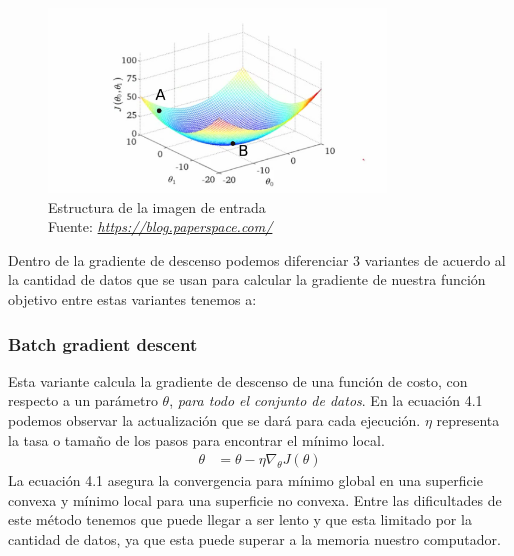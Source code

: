 \begin{figure}[H]
	\centering
	\includegraphics[width=0.8\textwidth]{Figures/gd.png}
	\caption{Estructura de la imagen de entrada \\ Fuente:  \href{https://blog.paperspace.com/intro-to-optimization-in-deep-learning-gradient-descent/}{\textit{https://blog.paperspace.com/}}}
	\label{image}
\end{figure} 

Dentro de la gradiente de descenso podemos diferenciar 3 variantes de acuerdo al la cantidad de datos que se usan para calcular la gradiente de nuestra función objetivo entre estas variantes tenemos a:\\

\subsubsection{Batch gradient descent}
Esta variante calcula la gradiente de descenso de una función de costo, con respecto a un parámetro $\theta$, \textit{para todo el conjunto de datos}. En la ecuación 4.1 podemos observar la actualización que se dará para cada ejecución. $\eta$ representa la tasa o tamaño de los pasos para encontrar el mínimo local.
\begin{equation}
\label{bgds}
\begin{aligned}
\theta &= \theta - \eta \nabla_{\theta} J(\theta)
\end{aligned}
\end{equation}
La ecuación 4.1 asegura la convergencia para mínimo global en una superficie convexa y mínimo local para una superficie no convexa. Entre las dificultades de este método tenemos que puede llegar a ser lento y que esta limitado por la cantidad de datos, ya que esta puede superar a la memoria nuestro computador.	

